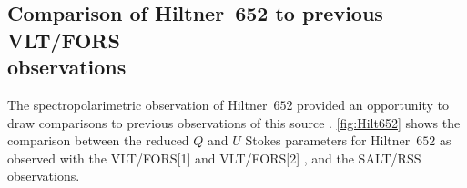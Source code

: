 

\subsection[Comparison of Hiltner~652 to VLT/FORS observations]{Comparison of Hiltner~652 to previous \gls{VLT}/\gls{FORS}\\observations}

The spectropolarimetric observation of Hiltner~$652$ provided an opportunity to draw comparisons to previous observations of this source \citep[presented in part in][]{Cooper_HEASA2022}.
\autoref{fig:Hilt652} shows the comparison between the reduced $Q$ and $U$ Stokes parameters for Hiltner~$652$ as observed with the \gls{VLT}/\gls{FORS}[1] and \gls{VLT}/\gls{FORS}[2] \citep[as reported by][]{FORS1, FORS2}, and the \gls{SALT}/\gls{RSS} observations.

